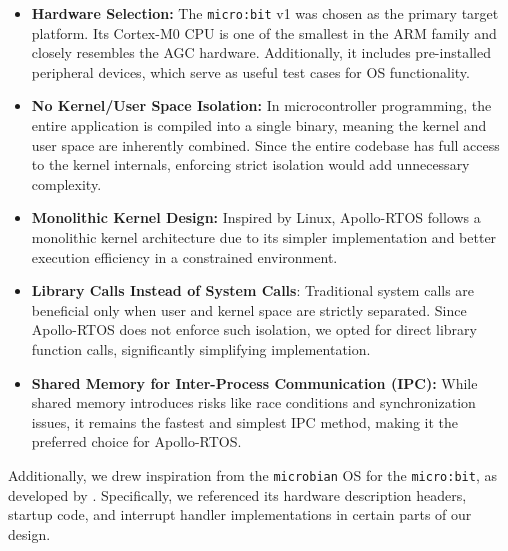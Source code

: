 \begin{itemize}
    \item \textbf{Hardware Selection:} The \texttt{micro:bit} v1 was chosen as the
        primary target platform. Its Cortex-M0 CPU is one of the smallest in the ARM
        family and closely resembles the AGC hardware. Additionally, it includes
        pre-installed peripheral devices, which serve as useful test cases for OS
        functionality.

    \item \textbf{No Kernel/User Space Isolation:} In microcontroller programming, the
        entire application is compiled into a single binary, meaning the kernel and
        user space are inherently combined. Since the entire codebase has full access
        to the kernel internals, enforcing strict isolation would add unnecessary
        complexity.

    \item \textbf{Monolithic Kernel Design:} Inspired by Linux, Apollo-RTOS follows a
        monolithic kernel architecture due to its simpler implementation and better
        execution efficiency in a constrained environment.

    \item \textbf{Library Calls Instead of System Calls}: Traditional system calls are
        beneficial only when user and kernel space are strictly separated. Since
        Apollo-RTOS does not enforce such isolation, we opted for direct library
        function calls, significantly simplifying implementation.

    \item \textbf{Shared Memory for Inter-Process Communication (IPC):} While shared
        memory introduces risks like race conditions and synchronization issues, it
        remains the fastest and simplest IPC method, making it the preferred choice for
        Apollo-RTOS.
\end{itemize}

Additionally, we drew inspiration from the \texttt{microbian} OS for the
\texttt{micro:bit}, as developed by \citet{microbian}. Specifically, we referenced its
hardware description headers, startup code, and interrupt handler implementations in
certain parts of our design.


